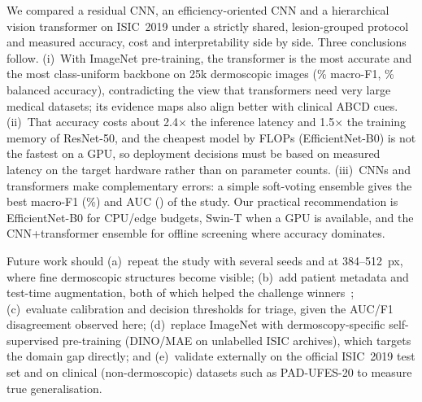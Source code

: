 We compared a residual CNN, an efficiency-oriented CNN and a hierarchical vision transformer on
ISIC~2019 under a strictly shared, lesion-grouped protocol and measured accuracy, cost and
interpretability side by side. Three conclusions follow. (i)~With ImageNet pre-training, the
transformer is the most accurate and the most class-uniform backbone on 25k dermoscopic images
(\SwinFone\% macro-F1, \SwinBalAcc\% balanced accuracy), contradicting the view that transformers
need very large medical datasets; its evidence maps also align better with clinical ABCD cues.
(ii)~That accuracy costs about 2.4$\times$ the inference latency and 1.5$\times$ the training memory
of ResNet-50, and the cheapest model by FLOPs (EfficientNet-B0) is not the fastest on a GPU, so
deployment decisions must be based on measured latency on the target hardware rather than on
parameter counts. (iii)~CNNs and transformers make complementary errors: a simple soft-voting
ensemble gives the best macro-F1 (\EnsFone\%) and AUC (\EnsAuc{}) of the study. Our practical
recommendation is EfficientNet-B0 for CPU/edge budgets, Swin-T when a GPU is available, and the
CNN+transformer ensemble for offline screening where accuracy dominates.

Future work should (a)~repeat the study with several seeds and at 384--512~px, where fine
dermoscopic structures become visible; (b)~add patient metadata and test-time augmentation, both
of which helped the challenge winners~\cite{gessert2020isic2019}; (c)~evaluate calibration and
decision thresholds for triage, given the AUC/F1 disagreement observed here; (d)~replace ImageNet
with dermoscopy-specific self-supervised pre-training (DINO/MAE on unlabelled ISIC archives), which
targets the domain gap directly; and (e)~validate externally on the official ISIC~2019 test set
and on clinical (non-dermoscopic) datasets such as PAD-UFES-20 to measure true generalisation.
